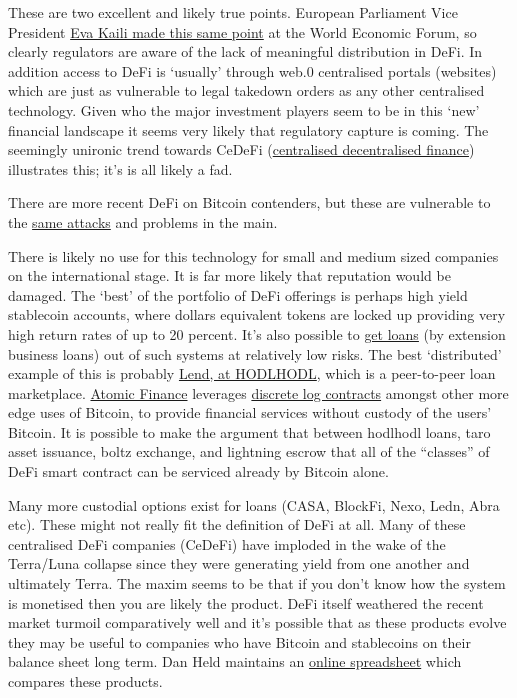 These are two excellent and likely true points. European Parliament Vice President \href{https://cointelegraph.com/news/wef-2022-most-defi-protocols-aren-t-really-decentralized-says-european-parliament-vp?}{Eva Kaili made this same point} at the World Economic Forum, so clearly regulators are aware of the lack of meaningful distribution in DeFi. In addition access to DeFi is `usually' through web.0 centralised portals (websites) which are just as vulnerable to legal takedown orders as any other centralised technology. Given who the major investment players seem to be in this `new' financial landscape it seems very likely that regulatory capture is coming. The seemingly unironic trend towards CeDeFi (\href{https://www.nasdaq.com/articles/cedefi-what-it-is-and-why-it-matters}{centralised decentralised finance}) illustrates this; it's is all likely a fad.\par
There are more recent DeFi on Bitcoin contenders, but these are vulnerable to the \href{https://bisq.community/t/trading-halted-until-v1-3-0-hotfix/9208}{same attacks} and problems in the main. \par 
There is likely no use for this technology for small and medium sized companies on the international stage. It is far more likely that reputation would be damaged. The `best' of the portfolio of DeFi offerings is perhaps high yield stablecoin accounts, where dollars equivalent tokens are locked up providing very high return rates of up to 20 percent. It's also possible to \href{https://www.coindesk.com/layer2/2022/07/20/the-credit-crunch-is-not-the-end-of-crypto-lending/}{get loans} (by extension business loans) out of such systems at relatively low risks. The best `distributed' example of this is probably \href{https://lend.hodlhodl.com/}{Lend, at HODLHODL}, which is a peer-to-peer loan marketplace. \href{https://atomic.finance/blog/a-laypersons-guide-to-discreet-log-contracts-atomic-yield-series-part-3/}{Atomic Finance} leverages \href{https://adiabat.github.io/dlc.pdf}{discrete log contracts} amongst other more edge uses of Bitcoin, to provide financial services without custody of the users' Bitcoin. It is possible to make the argument that between hodlhodl loans, taro asset issuance, boltz exchange, and lightning escrow that all of the ``classes'' of DeFi smart contract can be serviced already by Bitcoin alone.\par
Many more custodial options exist for loans (CASA, BlockFi, Nexo, Ledn, Abra etc). These might not really fit the definition of DeFi at all. Many of these centralised DeFi companies (CeDeFi) have imploded in the wake of the Terra/Luna collapse since they were generating yield from one another and ultimately Terra. The maxim seems to be that if you don't know how the system is monetised then you are likely the product. DeFi itself weathered the recent market turmoil comparatively well and it's possible that as these products evolve they may be useful to companies who have Bitcoin and stablecoins on their balance sheet long term. Dan Held maintains an \href{https://docs.google.com/spreadsheets/d/1ZoapTCl76wahFMeNISSx9UdC3QBx-zC_jY4Le1H5Sdg/htmlview#}{online spreadsheet} which compares these products.\par
